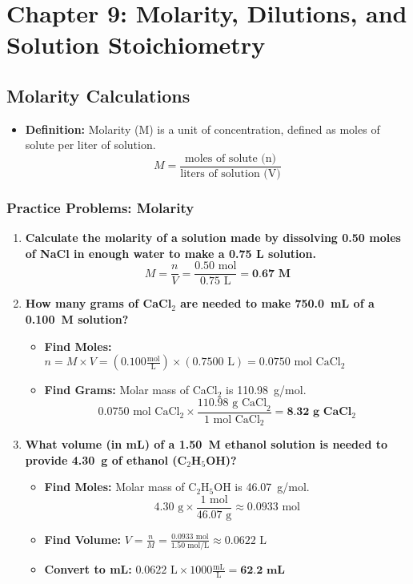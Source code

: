 \documentclass{article}
\begin{document}
\section*{Chapter 9: Molarity, Dilutions, and Solution Stoichiometry}

\subsection*{Molarity Calculations}
\begin{itemize}[itemsep=5pt]
    \item \textbf{Definition:} Molarity (M) is a unit of concentration, defined as moles of solute per liter of solution.
    \[ M = \frac{\text{moles of solute (n)}}{\text{liters of solution (V)}} \]
\end{itemize}

\subsubsection*{Practice Problems: Molarity}
\begin{enumerate}[itemsep=5pt]
    \item \textbf{Calculate the molarity of a solution made by dissolving 0.50 moles of NaCl in enough water to make a 0.75 L solution.}
    \[ M = \frac{n}{V} = \frac{0.50 \text{ mol}}{0.75 \text{ L}} = \textbf{0.67 M} \]
    \item \textbf{How many grams of CaCl\(_2\) are needed to make \SI{750.0}{mL} of a \SI{0.100}{M} solution?}
    \begin{itemize}
        \item \textbf{Find Moles:} \( n = M \times V = (0.100 \frac{\text{mol}}{\text{L}}) \times (0.7500 \text{ L}) = 0.0750 \text{ mol CaCl}_2 \)
        \item \textbf{Find Grams:} Molar mass of CaCl\(_2\) is \SI{110.98}{g/mol}.
        \[ 0.0750 \text{ mol CaCl}_2 \times \frac{110.98 \text{ g CaCl}_2}{1 \text{ mol CaCl}_2} = \textbf{8.32 g CaCl\(_2\)} \]
    \end{itemize}
    \item \textbf{What volume (in mL) of a \SI{1.50}{M} ethanol solution is needed to provide \SI{4.30}{g} of ethanol (C\(_2\)H\(_5\)OH)?}
     \begin{itemize}
        \item \textbf{Find Moles:} Molar mass of C\(_2\)H\(_5\)OH is \SI{46.07}{g/mol}.
        \[ 4.30 \text{ g} \times \frac{1 \text{ mol}}{46.07 \text{ g}} \approx 0.0933 \text{ mol} \]
        \item \textbf{Find Volume:} \( V = \frac{n}{M} = \frac{0.0933 \text{ mol}}{1.50 \text{ mol/L}} \approx 0.0622 \text{ L} \)
        \item \textbf{Convert to mL:} \( 0.0622 \text{ L} \times 1000 \frac{\text{mL}}{\text{L}} = \textbf{62.2 mL} \)
    \end{itemize}
\end{enumerate}
\end{document}
